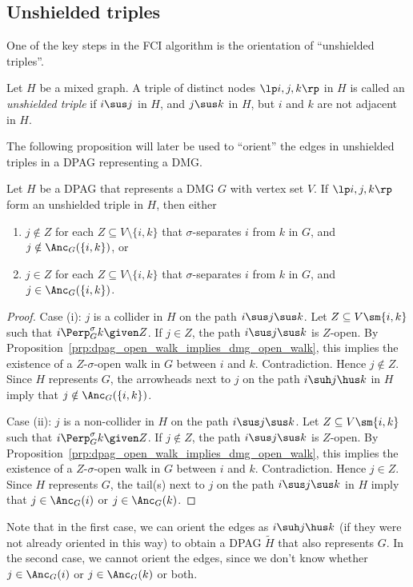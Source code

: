 \subsection{Unshielded triples}

One of the key steps in the FCI algorithm is the orientation of ``unshielded triples''.
\begin{Def}\label{def:unshielded_triple}
  Let $H$ be a mixed graph. A triple of distinct nodes $\lt i,j,k \rt$ in $H$ is called
  an \emph{unshielded triple} if $i \sus j$ in $H$, and $j \sus k$ in $H$, but
  $i$ and $k$ are not adjacent in $H$.
\end{Def}
The following proposition will later be used to ``orient'' the edges in unshielded triples
in a DPAG representing a DMG.

\begin{Prp}\label{prp:orienting_unshielded_triples}
  Let $H$ be a DPAG that represents a DMG $G$ with vertex set $V$.
  If $\lt i, j, k \rt$ form an unshielded triple in $H$, then
  either 
  \begin{enumerate}[label=(\roman*)]
    \item $j \notin Z$ for each $Z \subseteq V \setminus \{i,k\}$ that $\sigma$-separates $i$ from $k$ in $G$, and $j \notin \Anc_G(\{i,k\})$, or
    \item $j \in Z$ for each $Z \subseteq V \setminus \{i,k\}$ that $\sigma$-separates $i$ from $k$ in $G$, and $j \in \Anc_G(\{i,k\})$.
  \end{enumerate}
\end{Prp}
\begin{proof}
  Case (i): $j$ is a collider in $H$ on the path $i \sus j \sus k$.
  Let $Z \subseteq V \sm \{i,k\}$ such that $i \Perp^\sigma_G k \given Z$. 
  If $j \in Z$, the path $i \sus j \sus k$ is $Z$-open.
  By Proposition~\ref{prp:dpag_open_walk_implies_dmg_open_walk}, this implies the existence of a $Z$-$\sigma$-open walk in $G$ between $i$ and $k$.
  Contradiction. 
  Hence $j \notin Z$.
  Since $H$ represents $G$, the arrowheads next to $j$ on the path $i \suh j \hus k$ in $H$ imply that $j \notin \Anc_G(\{i,k\})$.

  Case (ii): $j$ is a non-collider in $H$ on the path $i \sus j \sus k$.
  Let $Z \subseteq V \sm \{i,k\}$ such that $i \Perp^\sigma_G k \given Z$. 
  If $j \notin Z$, the path $i \sus j \sus k$ is $Z$-open.
  By Proposition~\ref{prp:dpag_open_walk_implies_dmg_open_walk}, this implies the existence of a $Z$-$\sigma$-open walk in $G$ between $i$ and $k$.
  Contradiction. 
  Hence $j \in Z$.
  Since $H$ represents $G$, the tail(s) next to $j$ on the path $i \sus j \sus k$ in $H$ imply that $j \in \Anc_G(i)$ or $j \in \Anc_G(k)$.
\end{proof}
Note that in the first case, we can orient the edges as $i \suh j \hus k$ (if they were not already oriented in this way) to obtain a DPAG $\tilde{H}$ that also represents $G$. 
In the second case, we cannot orient the edges, since we don't know whether $j \in \Anc_G(i)$ or $j \in \Anc_G(k)$ or both.

